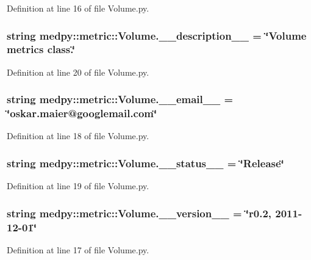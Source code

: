 Definition at line 16 of file Volume.py.

\hypertarget{namespacemedpy_1_1metric_1_1Volume_a397a8890b8ea74b388ad7a615451a178}{
\subsubsection[{\_\-\_\-description\_\-\_\-}]{\setlength{\rightskip}{0pt plus 5cm}string {\bf medpy::metric::Volume.\_\-\_\-description\_\-\_\-} = \char`\"{}Volume metrics class.\char`\"{}}}
\label{namespacemedpy_1_1metric_1_1Volume_a397a8890b8ea74b388ad7a615451a178}


Definition at line 20 of file Volume.py.

\hypertarget{namespacemedpy_1_1metric_1_1Volume_ab447960674465e32579b2c55155d1990}{
\subsubsection[{\_\-\_\-email\_\-\_\-}]{\setlength{\rightskip}{0pt plus 5cm}string {\bf medpy::metric::Volume.\_\-\_\-email\_\-\_\-} = \char`\"{}oskar.maier@googlemail.com\char`\"{}}}
\label{namespacemedpy_1_1metric_1_1Volume_ab447960674465e32579b2c55155d1990}


Definition at line 18 of file Volume.py.

\hypertarget{namespacemedpy_1_1metric_1_1Volume_a57f29a09c9d9ee64bd060b2408f8b351}{
\subsubsection[{\_\-\_\-status\_\-\_\-}]{\setlength{\rightskip}{0pt plus 5cm}string {\bf medpy::metric::Volume.\_\-\_\-status\_\-\_\-} = \char`\"{}Release\char`\"{}}}
\label{namespacemedpy_1_1metric_1_1Volume_a57f29a09c9d9ee64bd060b2408f8b351}


Definition at line 19 of file Volume.py.

\hypertarget{namespacemedpy_1_1metric_1_1Volume_a7d49eba625f2786d0be1d2867f5fcd5c}{
\subsubsection[{\_\-\_\-version\_\-\_\-}]{\setlength{\rightskip}{0pt plus 5cm}string {\bf medpy::metric::Volume.\_\-\_\-version\_\-\_\-} = \char`\"{}r0.2, 2011-\/12-\/01\char`\"{}}}
\label{namespacemedpy_1_1metric_1_1Volume_a7d49eba625f2786d0be1d2867f5fcd5c}


Definition at line 17 of file Volume.py.

